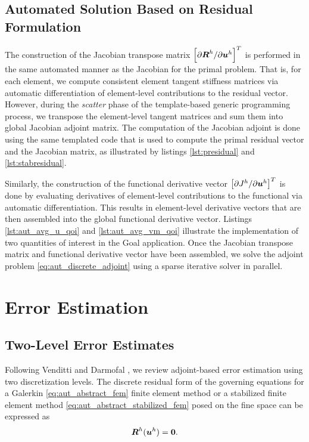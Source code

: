 \subsection{Automated Solution Based on Residual Formulation}

The construction of the Jacobian transpose matrix $\left[ \partial \boldsymbol{R}^h
/ \partial \boldsymbol{u}^h \right]^T$ is performed in the same automated manner as
the Jacobian for the primal problem. That is, for each element, we compute
consistent element tangent stiffness matrices via automatic differentiation
of element-level contributions to the residual vector. However, during the
\emph{scatter} phase of the template-based generic programming process,
we transpose the element-level tangent matrices and
sum them into global Jacobian adjoint matrix. The computation of the Jacobian
adjoint is done using the same templated code that is used to compute
the primal residual vector and the Jacobian matrix, as illustrated by
listings \ref{lst:presidual} and \ref{lst:stabresidual}.

Similarly, the construction of the functional derivative vector
$\left[ \partial J^h / \partial \boldsymbol{u}^h \right]^T$ is done by evaluating
derivatives of element-level contributions to the functional via automatic
differentiation. This results in element-level derivative vectors that are
then assembled into the global functional derivative vector. Listings
\ref{lst:aut_avg_u_qoi} and \ref{lst:aut_avg_vm_qoi} illustrate the
implementation of two quantities of interest in the Goal application. Once
the Jacobian transpose matrix and functional derivative vector have been
assembled, we solve the adjoint problem \eqref{eq:aut_discrete_adjoint} using
a sparse iterative solver in parallel.

\section{Error Estimation}
\label{sec:aut_error}

\subsection{Two-Level Error Estimates}

Following Venditti and Darmofal
\cite{venditti2000adjoint, venditti2002adjoint, venditti2003adjoint},
we review adjoint-based error estimation using two discretization levels.
The discrete residual form of the governing equations for a Galerkin
\eqref{eq:aut_abstract_fem} finite element method or a stabilized finite
element method \eqref{eq:aut_abstract_stabilized_fem} posed on the fine
space can be expressed as
%
\begin{gather}
\boldsymbol{R}^h(\boldsymbol{u}^h) = \boldsymbol{0}.
\label{eq:aut_fine_resid}
\end{gather}
%

